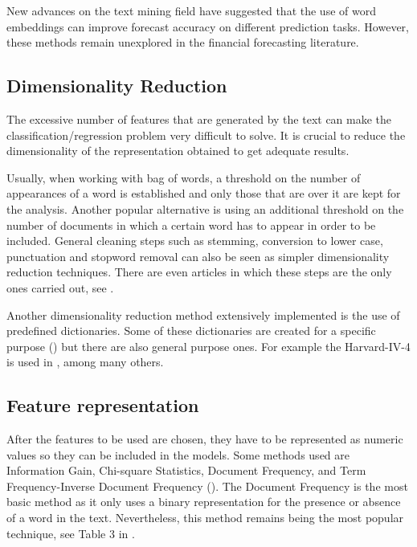 \documentclass[a4paper, 12pt]{report}
\begin{document}
    New advances on the text mining field have suggested that the use of word embeddings can improve forecast accuracy on different prediction tasks. However, these methods remain unexplored in the financial forecasting literature. 
    
    \subsection{Dimensionality Reduction}
    The excessive number of features that are generated by the text can make the classification/regression problem very difficult to solve. It is crucial to reduce the dimensionality of the representation obtained to get adequate results. 
    
    Usually, when working with bag of words, a threshold on the number of appearances of a word is established and only those that are over it are kept for the analysis. Another popular alternative is using an additional threshold on the number of documents in which a certain word has to appear in order to be included. General cleaning steps such as stemming, conversion to lower case, punctuation and stopword removal can also be seen as simpler dimensionality reduction techniques. There are even articles in which these steps are the only ones carried out, see \textcite{Fung:2003}.
    
    Another dimensionality reduction method extensively implemented is the use of predefined dictionaries. Some of these dictionaries are created for a specific purpose (\textcite{Loughran:2011}) but there are also general purpose ones. For example the Harvard-IV-4 is used in \textcite{Tetlock:2008}, among many others.
    
    \subsection{Feature representation}
    After the features to be used are chosen, they have to be represented as numeric values so they can be included in the models. Some methods used are Information Gain, Chi-square Statistics, Document Frequency, and Term Frequency-Inverse Document Frequency (\textcite{Tasci:2013}). The Document Frequency is the most basic method as it only uses a binary representation for the presence or absence of a word in the text. Nevertheless, this method remains being the most popular technique, see Table 3 in \textcite{Nassirtoussi:2014}.
    
    
\end{document}

